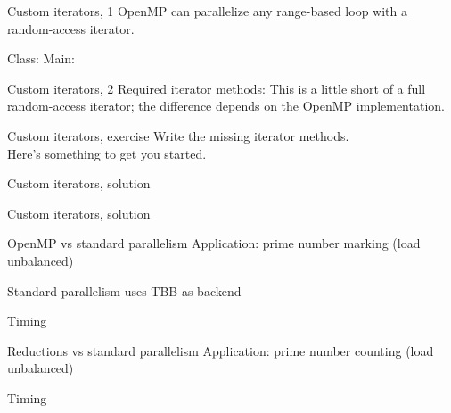 \begin{numberedframe}{Custom iterators, 1}
  OpenMP can parallelize any range-based loop with a random-access iterator.
  \begin{multicols}{2}
    Class:
    \columnbreak
    Main:
  \end{multicols}
\end{numberedframe}

\begin{numberedframe}{Custom iterators, 2}
  Required iterator methods:
  This is a little short of a full random-access iterator;
  the difference depends on the OpenMP implementation.
\end{numberedframe}

\begin{numberedframe}{Custom iterators, exercise}
  Write the missing iterator methods.\\
  Here's something to get you started.
\end{numberedframe}

\begin{numberedframe}{Custom iterators, solution}
\end{numberedframe}

\begin{numberedframe}{Custom iterators, solution}
\end{numberedframe}

\begin{numberedframe}{OpenMP vs standard parallelism}
  Application: prime number marking
  (load unbalanced)


  Standard parallelism uses \ac{TBB} as backend
\end{numberedframe}

\begin{numberedframe}{Timing}
  
\end{numberedframe}

\begin{numberedframe}{Reductions vs standard parallelism}
  Application: prime number counting
  (load unbalanced)


\end{numberedframe}

\begin{numberedframe}{Timing}
  
\end{numberedframe}

